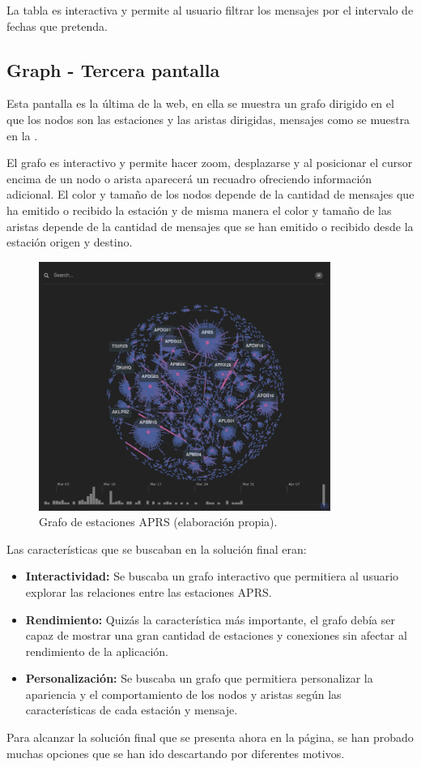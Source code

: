 La tabla es interactiva y permite al usuario filtrar los mensajes por el intervalo de fechas que pretenda.

\subsection{Graph - Tercera pantalla}
Esta pantalla es la última de la web, en ella se muestra un grafo dirigido en el que los nodos son las estaciones y las aristas dirigidas, mensajes como se muestra en la . 

El grafo es interactivo y permite hacer zoom, desplazarse y al posicionar el cursor encima de un nodo o arista aparecerá un recuadro ofreciendo información adicional. El color y tamaño de los nodos depende de la cantidad de mensajes que ha emitido o recibido la estación y de misma manera el color y tamaño de las aristas depende de la cantidad de mensajes que se han emitido o recibido desde la estación origen y destino.

\begin{figure}[h]
	\centering
	\includegraphics[width=0.85\textwidth]{Imagenes/Chapter_4/graph.png}
	\caption[Grafo de estaciones APRS.]{Grafo de estaciones APRS (elaboración propia).}
	\label{fig:graph}
\end{figure}
Las características que se buscaban en la solución final eran:

\begin{itemize}
	\item \textbf{Interactividad:} Se buscaba un grafo interactivo que permitiera al usuario explorar las relaciones entre las estaciones APRS.
	\item \textbf{Rendimiento:} Quizás la característica más importante, el grafo debía ser capaz de mostrar una gran cantidad de estaciones y conexiones sin afectar al rendimiento de la aplicación.
	\item \textbf{Personalización:} Se buscaba un grafo que permitiera personalizar la apariencia y el comportamiento de los nodos y aristas según las características de cada estación y mensaje.
\end{itemize}
Para alcanzar la solución final que se presenta ahora en la página, se han probado muchas opciones que se han ido descartando por diferentes motivos.
